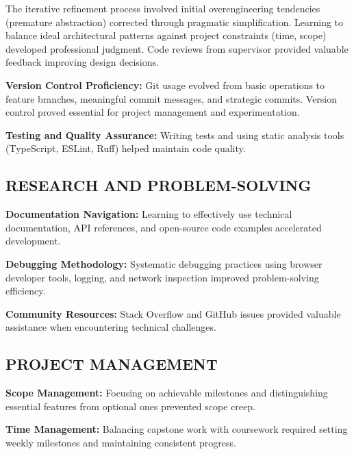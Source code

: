 \documentclass[12pt]{article}
\begin{document}
The iterative refinement process involved initial overengineering tendencies (premature abstraction) corrected through pragmatic simplification. Learning to balance ideal architectural patterns against project constraints (time, scope) developed professional judgment. Code reviews from supervisor provided valuable feedback improving design decisions.

\hspace{\parindent}\textbf{Version Control Proficiency:} Git usage evolved from basic operations to feature branches, meaningful commit messages, and strategic commits. Version control proved essential for project management and experimentation.

\hspace{\parindent}\textbf{Testing and Quality Assurance:} Writing tests and using static analysis tools (TypeScript, ESLint, Ruff) helped maintain code quality.

\subsection{RESEARCH AND PROBLEM-SOLVING}

\hspace{\parindent}\textbf{Documentation Navigation:} Learning to effectively use technical documentation, API references, and open-source code examples accelerated development.

\hspace{\parindent}\textbf{Debugging Methodology:} Systematic debugging practices using browser developer tools, logging, and network inspection improved problem-solving efficiency.

\hspace{\parindent}\textbf{Community Resources:} Stack Overflow and GitHub issues provided valuable assistance when encountering technical challenges.

\subsection{PROJECT MANAGEMENT}

\hspace{\parindent}\textbf{Scope Management:} Focusing on achievable milestones and distinguishing essential features from optional ones prevented scope creep.

\hspace{\parindent}\textbf{Time Management:} Balancing capstone work with coursework required setting weekly milestones and maintaining consistent progress.
\end{document}
